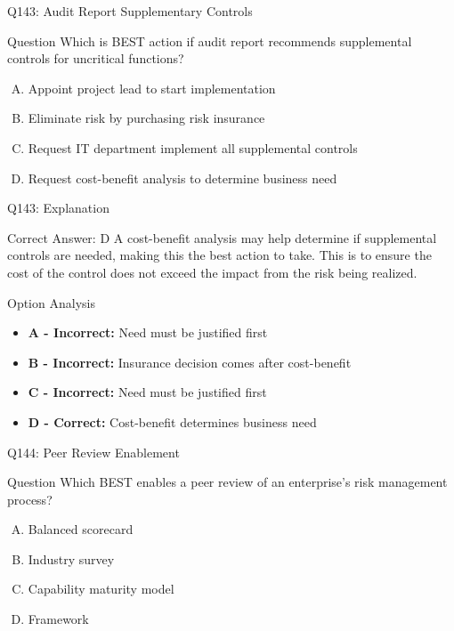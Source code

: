 \documentclass{beamer}
\begin{document}
	\begin{frame}{Q143: Audit Report Supplementary Controls}
		\begin{block}{Question}
			Which is BEST action if audit report recommends supplemental controls for uncritical functions?
		\end{block}
		\begin{enumerate}[(A)]
			\item Appoint project lead to start implementation
			\item Eliminate risk by purchasing risk insurance
			\item Request IT department implement all supplemental controls
			\item Request cost-benefit analysis to determine business need
		\end{enumerate}
	\end{frame}
	
	\begin{frame}{Q143: Explanation}
		\begin{block}{Correct Answer: D}
			A cost-benefit analysis may help determine if supplemental controls are needed, making this the best action to take. This is to ensure the cost of the control does not exceed the impact from the risk being realized.
		\end{block}
		\begin{block}{Option Analysis}
			\begin{itemize}
				\item \textbf{A - Incorrect:} Need must be justified first
				\item \textbf{B - Incorrect:} Insurance decision comes after cost-benefit
				\item \textbf{C - Incorrect:} Need must be justified first
				\item \textbf{D - Correct:} Cost-benefit determines business need
			\end{itemize}
		\end{block}
	\end{frame}
	
	\begin{frame}{Q144: Peer Review Enablement}
		\begin{block}{Question}
			Which BEST enables a peer review of an enterprise's risk management process?
		\end{block}
		\begin{enumerate}[(A)]
			\item Balanced scorecard
			\item Industry survey
			\item Capability maturity model
			\item Framework
		\end{enumerate}
	\end{frame}
	
\end{document}
